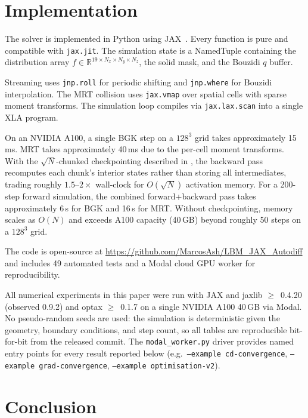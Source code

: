 \documentclass[10pt,twocolumn]{article}
\begin{document}
\section{Implementation}
\label{sec:implementation}

The solver is implemented in Python using JAX~\cite{jax2018}. Every
function is pure and compatible with \texttt{jax.jit}. The simulation
state is a NamedTuple containing the distribution array $f \in
\mathbb{R}^{19 \times N_x \times N_y \times N_z}$, the solid mask, and
the Bouzidi $q$ buffer.

Streaming uses \texttt{jnp.roll} for periodic shifting and
\texttt{jnp.where} for Bouzidi interpolation. The MRT collision uses
\texttt{jax.vmap} over spatial cells with sparse moment transforms.
The simulation loop compiles via \texttt{jax.lax.scan} into a single XLA
program.

On an NVIDIA A100, a single BGK step on a $128^3$ grid takes
approximately 15\,ms. MRT takes approximately 40\,ms due to the
per-cell moment transforms. With the $\sqrt{N}$-chunked
checkpointing described in , the backward pass
recomputes each chunk's interior states rather than storing all
intermediates, trading roughly $1.5$--$2{\times}$ wall-clock for
$O(\sqrt{N})$ activation memory. For a 200-step forward simulation,
the combined forward+backward pass takes approximately 6\,s for BGK
and 16\,s for MRT. Without checkpointing, memory scales as $O(N)$
and exceeds A100 capacity (40\,GB) beyond roughly 50 steps on a
$128^3$ grid.

The code is open-source at
\url{https://github.com/MarcosAsh/LBM_JAX_Autodiff} and includes 49
automated tests and a Modal cloud GPU worker for reproducibility.

All numerical experiments in this paper were run with JAX and jaxlib
$\geq$~0.4.20 (observed 0.9.2) and optax $\geq$~0.1.7 on a single NVIDIA
A100 40\,GB via Modal. No pseudo-random seeds are used: the simulation
is deterministic given the geometry, boundary conditions, and step
count, so all tables are reproducible bit-for-bit from the released
commit. The \texttt{modal\_worker.py} driver provides named entry
points for every result reported below (e.g.\ \texttt{--example
cd-convergence}, \texttt{--example grad-convergence},
\texttt{--example optimisation-v2}).


\section{Conclusion}
\label{sec:conclusion}
\end{document}
